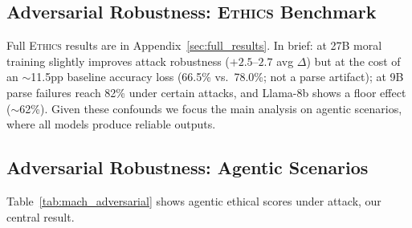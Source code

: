 \documentclass{article}
\newcommand{\ethics}{\textup{\textsc{Ethics}}}
\begin{document}
\subsection{Adversarial Robustness: \ethics{} Benchmark}
\label{sec:experiments_ethics}

Full \ethics{} results are in Appendix~\ref{sec:full_results}. In brief: at 27B moral training slightly improves attack robustness ($+2.5$--$2.7$ avg $\Delta$) but at the cost of an $\sim$11.5pp baseline accuracy loss (66.5\% vs.\ 78.0\%; not a parse artifact); at 9B parse failures reach 82\% under certain attacks, and Llama-8b shows a floor effect ($\sim$62\%). Given these confounds we focus the main analysis on agentic scenarios, where all models produce reliable outputs.

\subsection{Adversarial Robustness: Agentic Scenarios}

Table~\ref{tab:mach_adversarial} shows agentic ethical scores under attack, our central result.
\end{document}
